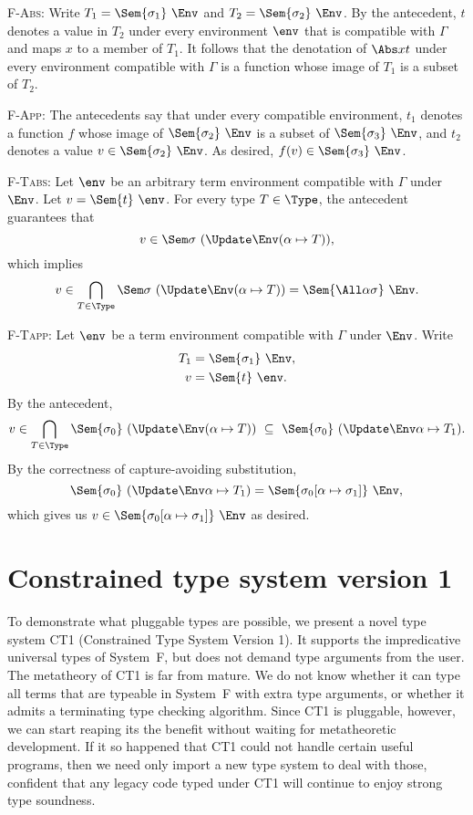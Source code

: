 \documentclass{amsart}
\theoremstyle{definition}
\begin{document}
\textsc{F-Abs}: Write $T_1=\Sem{\sigma_1}~\Env$ and
$T_2=\Sem{\sigma_2}~\Env$. By the antecedent, $t$ denotes a value
in $T_2$ under every environment $\env$ that is compatible with
$\Gamma$ and maps $x$ to a member of $T_1$. It follows that the
denotation of $\Abs xt$ under every environment compatible with
$\Gamma$ is a function whose image of $T_1$ is a subset of $T_2$.

\textsc{F-App}: The antecedents say that under every
compatible environment, $t_1$ denotes a function $f$ whose image
of $\Sem{\sigma_2}~\Env$ is a subset of $\Sem{\sigma_3}~\Env$,
and $t_2$ denotes a value $v\in\Sem{\sigma_2}~\Env$. As desired,
$f(v)\in\Sem{\sigma_3}~\Env$.

\textsc{F-Tabs}: Let $\env$ be an arbitrary term environment
compatible with $\Gamma$ under $\Env$. Let $v=\Sem{t}~\env$.
For every type $T\in\Type$, the antecedent guarantees that
\[
v\in\Sem\sigma~(\Update\Env(\alpha\mapsto T)),
\]
which implies
\[
v\in\bigcap_{T\in\Type}\Sem\sigma~(\Update\Env(\alpha\mapsto T))
=\Sem{\All\alpha\sigma}~\Env.
\]

\textsc{F-Tapp}: Let $\env$ be a term environment compatible with
$\Gamma$ under $\Env$. Write
\begin{align*}
T_1&=\Sem{\sigma_1}~\Env,\\
v&=\Sem{t}~\env.
\end{align*}
By the antecedent,
\[
v\in
\bigcap_{T\in\Type}\Sem{\sigma_0}~(\Update\Env(\alpha\mapsto T))
\ \subseteq\ \Sem{\sigma_0}~(\Update\Env\alpha\mapsto T_1).
\]
By the correctness of capture-avoiding substitution,
\[
\Sem{\sigma_0}~(\Update\Env\alpha\mapsto T_1)
=
\Sem{\sigma_0[\alpha\mapsto\sigma_1]}~\Env,
\]
which gives us $v\in\Sem{\sigma_0[\alpha\mapsto\sigma_1]}~\Env$
as desired.


\section{Constrained type system version 1}

To demonstrate what pluggable types are possible, we present a
novel type system CT1 (Constrained Type System Version 1). It
supports the impredicative universal types of System~F, but does
not demand type arguments from the user. The metatheory of CT1 is
far from mature. We do not know whether it can type all terms
that are typeable in System~F with extra type arguments, or
whether it admits a terminating type checking algorithm. Since
CT1 is pluggable, however, we can start reaping its the benefit
without waiting for metatheoretic development. If it so happened
that CT1 could not handle certain useful programs, then we need
only import a new type system to deal with those, confident that
any legacy code typed under CT1 will continue to enjoy strong
type soundness.
\end{document}
